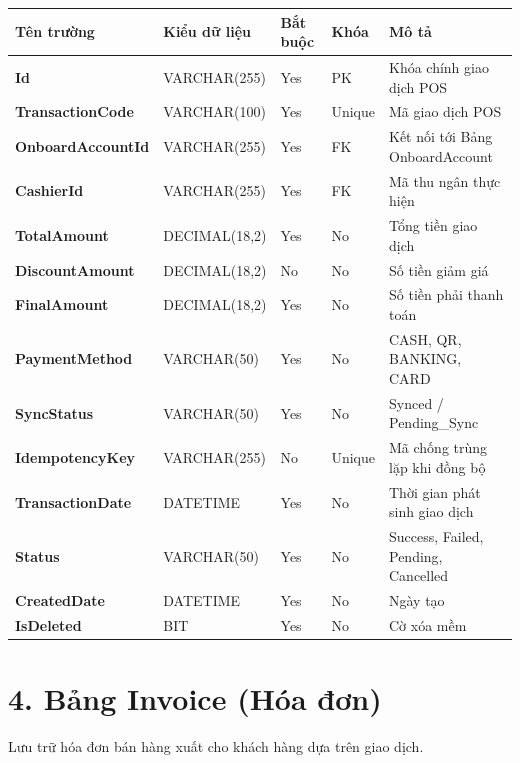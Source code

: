 \documentclass[11pt,a4paper]{article}
\begin{document}
	\begin{tabularx}{\textwidth}{|>{\bfseries}p{3.5cm}|p{2.5cm}|p{1.5cm}|p{1.8cm}|X|}
		\hline
		\rowcolor{tablehead} Tên trường & Kiểu dữ liệu & Bắt buộc & Khóa & Mô tả \\ \hline
		Id & VARCHAR(255) & Yes & PK & Khóa chính giao dịch POS \\ \hline
		TransactionCode & VARCHAR(100) & Yes & Unique & Mã giao dịch POS \\ \hline
		OnboardAccountId & VARCHAR(255) & Yes & FK & Kết nối tới Bảng OnboardAccount \\ \hline
		CashierId & VARCHAR(255) & Yes & FK & Mã thu ngân thực hiện \\ \hline
		TotalAmount & DECIMAL(18,2) & Yes & No & Tổng tiền giao dịch \\ \hline
		DiscountAmount & DECIMAL(18,2) & No & No & Số tiền giảm giá \\ \hline
		FinalAmount & DECIMAL(18,2) & Yes & No & Số tiền phải thanh toán \\ \hline
		PaymentMethod & VARCHAR(50) & Yes & No & CASH, QR, BANKING, CARD \\ \hline
		SyncStatus & VARCHAR(50) & Yes & No & Synced / Pending\_Sync \\ \hline
		IdempotencyKey & VARCHAR(255) & No & Unique & Mã chống trùng lặp khi đồng bộ \\ \hline
		TransactionDate & DATETIME & Yes & No & Thời gian phát sinh giao dịch \\ \hline
		Status & VARCHAR(50) & Yes & No & Success, Failed, Pending, Cancelled \\ \hline
		CreatedDate & DATETIME & Yes & No & Ngày tạo \\ \hline
		IsDeleted & BIT & Yes & No & Cờ xóa mềm \\ \hline
	\end{tabularx}
	
	\vspace{1.5em}
	
	\section{4. Bảng Invoice (Hóa đơn)}
	Lưu trữ hóa đơn bán hàng xuất cho khách hàng dựa trên giao dịch.
	
\end{document}
